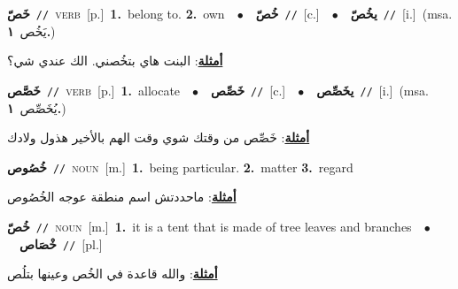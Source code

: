 \documentclass[10pt,a4paper,twoside]{article} %
\begin{document}
\begin{multicols}{2}
{\setlength\topsep{0pt}\textbf{\foreignlanguage{arabic}{خَصّ}}\ {\color{gray}\texttt{//}\color{black}}\ \textsc{verb}\ [p.]\ \textbf{1.}~belong to.  \textbf{2.}~own\ \ $\bullet$\ \ \setlength\topsep{0pt}\textbf{\foreignlanguage{arabic}{خُصّ}}\ {\color{gray}\texttt{//}\color{black}}\ [c.]\ \ $\bullet$\ \ \setlength\topsep{0pt}\textbf{\foreignlanguage{arabic}{يخُصّ}}\ {\color{gray}\texttt{//}\color{black}}\ [i.]\ \color{gray}(msa. \foreignlanguage{arabic}{يَخُص}~\foreignlanguage{arabic}{\textbf{١.}})\color{black}\  \begin{flushright}\color{gray}\foreignlanguage{arabic}{\textbf{\underline{\foreignlanguage{arabic}{أمثلة}}}: البنت هاي بتخُصني. الك عندي شي؟}\end{flushright}\color{black}} \vspace{2mm}

{\setlength\topsep{0pt}\textbf{\foreignlanguage{arabic}{خَصَّص}}\ {\color{gray}\texttt{//}\color{black}}\ \textsc{verb}\ [p.]\ \textbf{1.}~allocate\ \ $\bullet$\ \ \setlength\topsep{0pt}\textbf{\foreignlanguage{arabic}{خَصِّص}}\ {\color{gray}\texttt{//}\color{black}}\ [c.]\ \ $\bullet$\ \ \setlength\topsep{0pt}\textbf{\foreignlanguage{arabic}{يخَصِّص}}\ {\color{gray}\texttt{//}\color{black}}\ [i.]\ \color{gray}(msa. \foreignlanguage{arabic}{يُخَصِّص}~\foreignlanguage{arabic}{\textbf{١.}})\color{black}\  \begin{flushright}\color{gray}\foreignlanguage{arabic}{\textbf{\underline{\foreignlanguage{arabic}{أمثلة}}}: خَصِّص من وقتك شوي وقت الهم بالأخير هذول ولادك}\end{flushright}\color{black}} \vspace{2mm}

{\setlength\topsep{0pt}\textbf{\foreignlanguage{arabic}{خُصُوص}}\ {\color{gray}\texttt{//}\color{black}}\ \textsc{noun}\ [m.]\ \textbf{1.}~being particular.  \textbf{2.}~matter  \textbf{3.}~regard\  \begin{flushright}\color{gray}\foreignlanguage{arabic}{\textbf{\underline{\foreignlanguage{arabic}{أمثلة}}}: ماحددتش اسم منطقة عوجه الخُصُوص}\end{flushright}\color{black}} \vspace{2mm}

{\setlength\topsep{0pt}\textbf{\foreignlanguage{arabic}{خُصّ}}\ {\color{gray}\texttt{//}\color{black}}\ \textsc{noun}\ [m.]\ \textbf{1.}~it is a tent that is made of tree leaves and branches\ \ $\bullet$\ \ \setlength\topsep{0pt}\textbf{\foreignlanguage{arabic}{خْصَاص}}\ {\color{gray}\texttt{//}\color{black}}\ [pl.]\  \begin{flushright}\color{gray}\foreignlanguage{arabic}{\textbf{\underline{\foreignlanguage{arabic}{أمثلة}}}: والله قاعدة في الخُص وعينها بتلُص}\end{flushright}\color{black}} \vspace{2mm}


\end{multicols}
\end{document}
